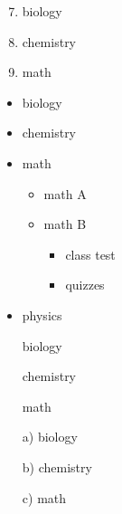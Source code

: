 \documentclass[11pt]{article}
\begin{document}
\vspace{1cm}

\begin{enumerate} \setcounter{enumi}{6}
\item biology
\item chemistry
\item math	
\end{enumerate}

\pagebreak

\begin{itemize}
\item biology
\item chemistry
\item math
	\begin{itemize}
	\item math A
	\item math B
		\begin{itemize}
		\item class test
		\item quizzes
		\end{itemize}
	\end{itemize}
\item physics	
\end{itemize}

\vspace{1cm}

\begin{enumerate}
\item[] biology
\item[] chemistry
\item[] math	
\end{enumerate}

\vspace{1cm}

\begin{enumerate}
\item[a)] biology
\item[b)] chemistry
\item[c)] math	
\end{enumerate}
\end{document}
